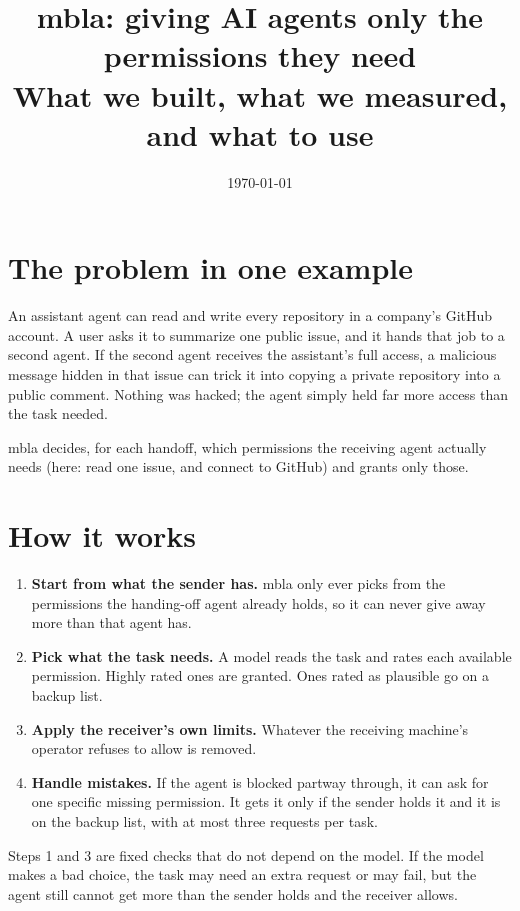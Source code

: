 \documentclass[11pt]{article}
\title{mbla: giving AI agents only the permissions they need\\\large What we built, what we measured, and what to use}
\date{\today}
\begin{document}
\maketitle

\section{The problem in one example}
An assistant agent can read and write every repository in a company's GitHub account. A user asks it to
summarize one public issue, and it hands that job to a second agent. If the second agent receives the
assistant's full access, a malicious message hidden in that issue can trick it into copying a private
repository into a public comment. Nothing was hacked; the agent simply held far more access than the task needed.

mbla decides, for each handoff, which permissions the receiving agent actually needs (here: read one
issue, and connect to GitHub) and grants only those.

\section{How it works}
\begin{enumerate}
  \item \textbf{Start from what the sender has.} mbla only ever picks from the permissions the handing-off
    agent already holds, so it can never give away more than that agent has.
  \item \textbf{Pick what the task needs.} A model reads the task and rates each available permission.
    Highly rated ones are granted. Ones rated as plausible go on a backup list.
  \item \textbf{Apply the receiver's own limits.} Whatever the receiving machine's operator refuses to allow is removed.
  \item \textbf{Handle mistakes.} If the agent is blocked partway through, it can ask for one specific missing
    permission. It gets it only if the sender holds it and it is on the backup list, with at most three requests per task.
\end{enumerate}
Steps 1 and 3 are fixed checks that do not depend on the model. If the model makes a bad choice, the task
may need an extra request or may fail, but the agent still cannot get more than the sender holds and the
receiver allows.
\end{document}
